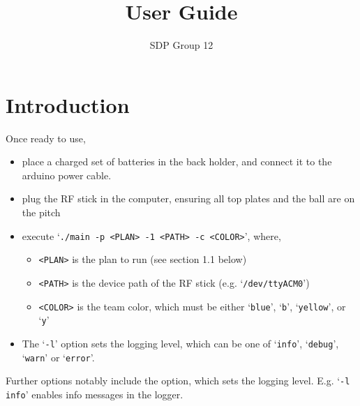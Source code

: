 \documentclass[12pt,a4paper]{article}
\author{SDP Group 12}
\title{User Guide}
\begin{document}
\maketitle




\section{Introduction}

Once ready to use, 

\begin{itemize}
    \item place a charged set of batteries in the back holder, and connect it to the arduino power cable.
    \item plug the RF stick in the computer, ensuring all top plates and the ball are on the pitch
    \item execute `\texttt{./main -p <PLAN> -1 <PATH> -c <COLOR>}', where,
    \begin{itemize}
	\item \texttt{<PLAN>} is the plan to run (see section 1.1 below)
	\item \texttt{<PATH>} is the device path of the RF stick (e.g. `\verb$/dev/ttyACM0$')
	\item \texttt{<COLOR>} is the team color, which must be either `\texttt{blue}', `\texttt{b}', `\texttt{yellow}', or `\texttt{y}'
    \end{itemize}
    \item The `\texttt{-l}' option sets the logging level, which can be one of `\texttt{info}', `\texttt{debug}', `\texttt{warn}' or `\texttt{error}'.
\end{itemize}

Further options notably include the 
option, which sets the logging level. E.g. `\texttt{-l info}' enables info
messages in the logger.
\end{document}
